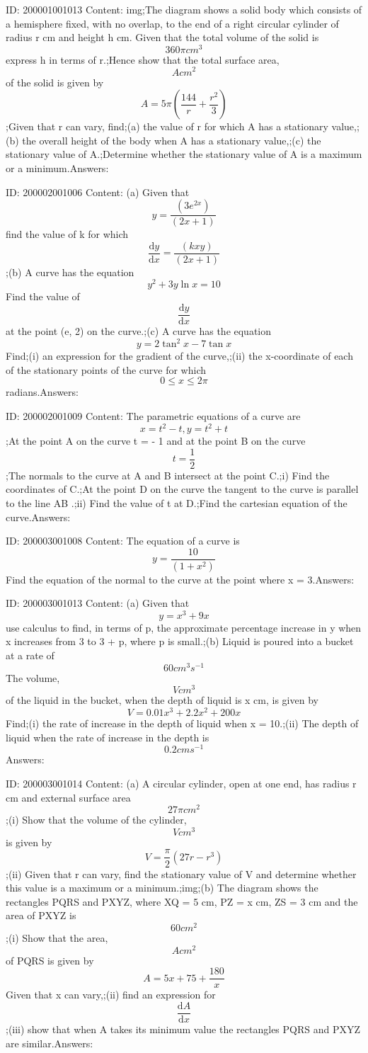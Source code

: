 \documentclass{article}
\begin{document}
ID: 200001001013
Content:
img;The diagram shows a solid body which consists of a hemisphere fixed, with no overlap, to the end of a right circular cylinder of radius r cm and height h cm. Given that the total volume of the solid is \[360\pi cm^3\] express h in terms of r.;Hence show that the total surface area, \[A cm^2\] of the solid is given by \[A=5\pi(\frac{144}{r}+\frac{r^{2}}{3})\] ;Given that r can vary, find;(a)	the value of r for which A has a stationary value,;(b)	the overall height of the body when A has a stationary value,;(c)	the stationary value of A.;Determine whether the stationary value of A is a maximum or a minimum.Answers:

ID: 200002001006
Content:
(a)	Given that \[y=\frac{(3e^{2x})}{(2x+1)}\]  find the value of k for which \[\frac{\mathrm{d} y}{\mathrm{d} x}=\frac{(kxy)}{(2x+1)}\];(b) A curve has the equation  \[y^2+3y \ln x=10\] Find the value of \[\frac{\mathrm{d} y}{\mathrm{d} x}\] at the point (e, 2) on the curve.;(c) A curve has the equation \[y=2\tan^2x-7\tan x\] Find;(i)	an expression for the gradient of the curve,;(ii)	the x-coordinate of each of the stationary points of the curve for which \[0\leq x\leq 2\pi\] radians.Answers:

ID: 200002001009
Content:
The parametric equations of a curve are \[x=t^2-t, y=t^2+t\];At the point A on the curve t = - 1 and at the point B on the curve \[t=\frac{1}{2}\] ;The normals to the curve at A and B intersect at the point C.;i) Find the coordinates of C.;At the point D on the curve the tangent to the curve is parallel to the line AB .;ii) Find the value of t at D.;Find the cartesian equation of the curve.Answers:

ID: 200003001008
Content:
The equation of a curve is \[y=\frac{10}{(1+x^2)}\] Find the equation of the normal to the curve at the point where x = 3.Answers:

ID: 200003001013
Content:
(a)	Given that \[y=x^3+9x\] use calculus to find, in terms of p, the approximate percentage increase in y when x increases from 3 to 3 + p, where p is small.;(b) 	Liquid is poured into a bucket at a rate of \[60cm^3s^{-1}\] The volume, \[Vcm^3\] of the liquid in the bucket, when the depth of liquid is x cm, is given by \[V=0.01x^3+2.2x^2+200x\] Find;(i)	the rate of increase in the depth of liquid when x = 10.;(ii)	The depth of liquid when the rate of increase in the depth is \[0.2 cms^{-1}\] Answers:

ID: 200003001014
Content:
(a)	A circular cylinder, open at one end, has radius r cm and external surface area \[27\pi cm^2\];(i)	Show that the volume of the cylinder, \[Vcm^3\] is given by \[V=\frac{\pi }{2}(27r-r^3)\] ;(ii)	Given that r can vary, find the stationary value of V and determine whether this value is a maximum or a minimum.;img;(b) The diagram shows the rectangles PQRS and PXYZ, where XQ =  5 cm, PZ = x cm, ZS = 3 cm and the area of PXYZ is \[60cm^2\];(i)	Show that the area, \[Acm^2\] of PQRS is given by \[A=5x+75+\frac{180}{x}\] Given that x can vary,;(ii)	find an expression for \[\frac{\mathrm{d} A}{\mathrm{d} x}\];(iii)	show that when A takes its minimum value the rectangles PQRS and PXYZ are similar.Answers:
\end{document}
